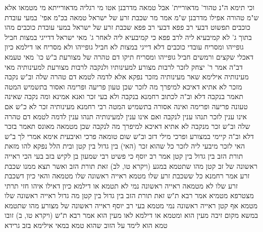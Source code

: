 \documentclass[12pt, openany]{book}
\begin{document}
{וכי תימא ה"נ טהור' מדאוריית' אבל טמאה מדרבנן אטו מי רגליה מדאורייתא מי מטמאו  אלא ש"מ  טהורה אפילו מדרבנן ש"מ
אמר מר  שכבת זרע של ישראל טמאה בכ"מ אפי' במעי עובדת כוכבים  תפשוט דבעי רב פפא  דבעי רב פפא  שכבת זרע של ישראל במעי עובדת כוכבים מהו 
בתוך ג' לא קמיבעיא ליה לרב פפא כי קמיבעיא ליה לאחר ג' מאי 
ישראל דדייגי במצות חביל גופייהו ומסריח עובדי כוכבים דלא דייגי במצות לא חביל גופייהו ולא מסריח  או דילמא  כיון דאכלי שקצים ורמשים חביל גופייהו ומסריח  תיקו
דם טהרה של מצורעת ב"ש כו' מאי טעמא דב"ה  אמר ר' יצחק  לזכר לרבות מצורע למעינותיו ולנקבה לרבות מצורעת למעינותיה 
מאי מעינותיה  אילימא שאר מעינותיה מזכר נפקא אלא לדמה לטמא דם טהרה שלה 
וב"ש  נקבה מזכר לא אתיא דאיכא למיפרך  מה לזכר שכן טעון פריעה ופרימה ואסור בתשמיש המטה תאמר בנקבה דלא 
וב"ה  לכתוב רחמנא בנקבה ולא בעי זכר  ואנא אמינא  ומה נקבה שאינה טעונה פריעה ופרימה ואינה אסורה בתשמיש המטה רבי רחמנא מעינותיה  זכר לא כ"ש 
אם אינו ענין לזכר תנהו ענין לנקבה ואם אינו ענין למעינותיה תנהו ענין לדמה לטמא דם טהרה שלה 
וב"ש  זכר מנקבה לא אתיא דאיכא למיפרך  מה לנקבה שכן מטמאה מאונס תאמר בזכר דלא 
וב"ה  קיימי במצורע ופרכי מילי דזב  וב"ש  שום טומאה פרכי 
ואיבעית אימא אמרי לך ב"ש  האי לזכר מיבעי ליה לזכר כל שהוא זכר (האי) בין גדול בין קטן  ובית הלל  נפקא להו מזאת תורת הזב בין גדול בין קטן 
אמר רב יוסף כי פשיט רבי שמעון בן לקיש בזב בעי הכי  ראייה ראשונה של זב קטן מהו שתטמא במגע  (ויקרא טו, לב) זאת תורת הזב ואשר תצא ממנו שכבת זרע אמר רחמנא
כל ששכבת זרע שלו מטמא ראייה ראשונה שלו מטמאה והאי כיון דשכבת זרע שלו לא מטמאה ראייה ראשונה נמי לא תטמא  או דילמא  כיון דאילו איהו חזי תרתי מצטרפא מטמיא 
אמר רבא  ת"ש זאת תורת הזב בין גדול בין קטן מה גדול ראייה ראשונה שלו מטמא אף קטן ראייה ראשונה נמי מטמא 
בעי רב יוסף  ראייה ראשונה של מצורע מהו שתטמא במשא  מקום זיבה מעין הוא ומטמא או דילמא לאו מעין הוא 
אמר רבא  ת"ש (ויקרא טו, ב) זובו טמא הוא לימד על הזוב שהוא טמא  במאי  אילימא בזב גרידא}
\end{document}
